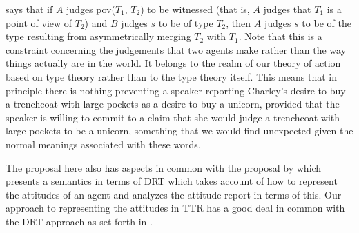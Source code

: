 \preveg{} says that if $A$ judges pov($T_1$, $T_2$) to be witnessed
(that is, $A$ judges that $T_1$ is a point of view of $T_2$) and $B$
judges $s$ to be of type $T_2$, then $A$ judges $s$ to be of the type
resulting from asymmetrically merging $T_2$ with $T_1$.  Note that
this is a constraint concerning the judgements that two agents make
rather than the way things actually are in the world.  It belongs to
the realm of our theory of action based on type theory rather than to
the type theory itself.  This means that in principle there is nothing
preventing a speaker reporting Charley's desire to buy a trenchcoat
with large pockets as a desire to buy a unicorn, provided that the
speaker is willing to commit to a claim that she would judge a
trenchcoat with large pockets to be a unicorn, something that we would
find unexpected given the normal meanings associated with these words.   

The proposal here also has aspects in common with the proposal by
\cite{Prossms} which presents a semantics in terms of DRT which takes
account of how to represent the attitudes of an agent and analyzes 
the attitude report in terms of this.  Our approach to representing
the attitudes in TTR has a good deal in common with the DRT approach
as set forth in \cite{Kamp1990,KampGenabithReyle2011}.

